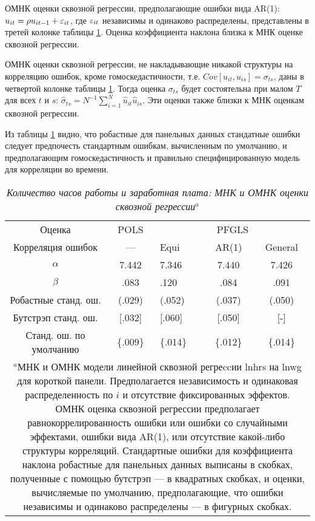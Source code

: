 ОМНК оценки сквозной регрессии, предполагающие ошибки вида AR(1): $u_{it}=\rho u_{it-1}+\varepsilon_{it}$, где $\varepsilon_{it}$ независимы и одинаково распределены, представлены в третей колонке таблицы \ref{Tab:21.7}. Оценка коэффициента наклона близка к МНК оценке сквозной регрессии.

ОМНК оценки сквозной регрессии, не накладывающие никакой структуры на корреляцию ошибок, кроме гомоскедастичности, т.е. $Cov[u_{it}, u_{is}]=\sigma_{ts}$, даны в четвертой колонке таблицы \ref{Tab:21.7}. Тогда оценка $\sigma_{ts}$ будет состоятельна при малом $T$ для всех $t$ и $s$: $\hat{\sigma}_{ts}=N^{-1}\sum^N_{i=1}\hat{u}_{it}\hat{u}_{is}$. Эти оценки также близки к МНК оценкам сквозной регрессии.

Из таблицы \ref{Tab:21.7} видно, что робастные для панельных данных стандатные ошибки следует предпочесть стандартным ошибкам, вычисленным по умолчанию, и предполагающим гомоскедастичность и правильно специфицированную модель для корреляции во времени.


 \begin{table}[ht]
\caption{{\it Количество часов работы и заработная плата: МНК и ОМНК оценки сквозной регрессии$^a$}} 
\centering
\begin{tabular}{cc p{2cm} cc}
\hline \hline
	Оценка & POLS & \multicolumn{3}{c}{PFGLS}\\
 Корреляция ошибок & --- & Equi & AR(1) & General\\
\hline
$\alpha$ & 7.442 & 7.346 & 7.440 & 7.426\\
$\beta$	& .083	& .120 	&.084 & .091 \\
Робастные станд. ош.		& (.029) &(.052) & (.037) & (.050) \\
Бутстрэп станд. ош.			& [.032] & [.060] & [.050] &[-] \\
Станд. ош. по умолчанию	& \{.009\} & \{.014\}& \{.012\}  & \{.014\} \\
\hline \hline
\multicolumn{5}{p{14cm}}{$^a$МНК и ОМНК модели линейной сквозной регреccии lnhrs на lnwg для короткой панели. Предполагается независимость и одинаковая распределенность по $i$ и отсутствие фиксированных эффектов.  ОМНК оценка сквозной регрессии предполагает равнокоррелированность  ошибки или ошибки со случайными эффектами, ошибки вида AR(1), или отсутствие какой-либо структуры корреляций. Стандартные ошибки для коэффициента наклона робастные для панельных данных выписаны в скобках, полученные с помощью бутстрэп --- в квадратных скобках, и оценки, вычисляемые по умолчанию, предполагающие, что ошибки независимы и одинаково распределены --- в фигурных скобках.} \\
\end{tabular}
\label{Tab:21.7}
\end{table}

